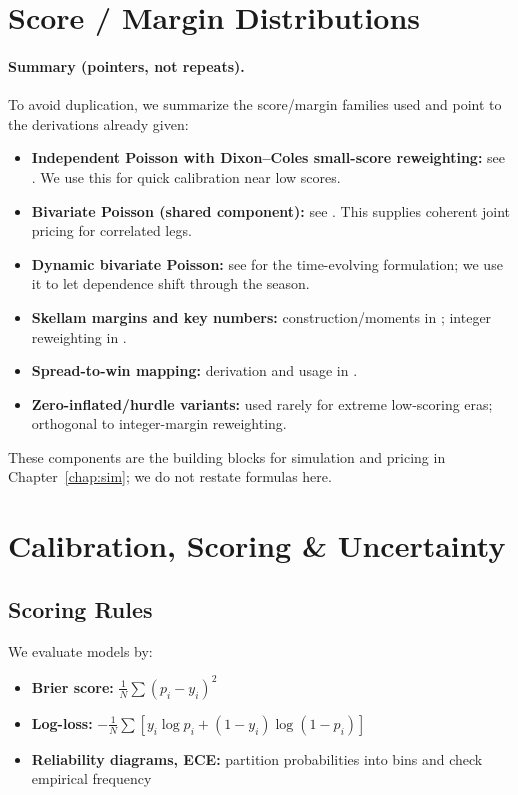 \section{Score / Margin Distributions}
\label{sec:score}

\paragraph{Summary (pointers, not repeats).} To avoid duplication, we summarize the score/margin families used and point to the derivations already given:
\begin{itemize}
  \item \textbf{Independent Poisson with Dixon--Coles small-score reweighting:} see . We use this for quick calibration near low scores.
  \item \textbf{Bivariate Poisson (shared component):} see . This supplies coherent joint pricing for correlated legs.
  \item \textbf{Dynamic bivariate Poisson:} see  for the time-evolving formulation; we use it to let dependence shift through the season.
  \item \textbf{Skellam margins and key numbers:} construction/moments in ; integer reweighting in .
  \item \textbf{Spread-to-win mapping:} derivation and usage in .
  \item \textbf{Zero-inflated/hurdle variants:} used rarely for extreme low-scoring eras; orthogonal to integer-margin reweighting.
\end{itemize}

These components are the building blocks for simulation and pricing in Chapter~\ref{chap:sim}; we do not restate formulas here.

\section{Calibration, Scoring \& Uncertainty}
\label{sec:calib}

\subsection{Scoring Rules}
We evaluate models by:
\begin{itemize}
  \item \textbf{Brier score:} \( \frac{1}{N} \sum (p_i - y_i)^2 \)
  \item \textbf{Log-loss:} \( -\frac{1}{N} \sum [y_i \log p_i + (1-y_i)\log(1-p_i)] \)
  \item \textbf{Reliability diagrams, ECE:} partition probabilities into bins and check empirical frequency
\end{itemize}

